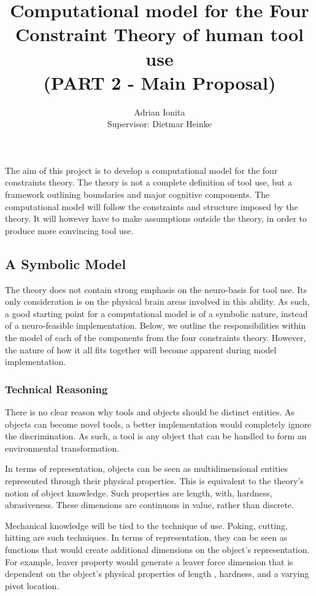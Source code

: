 \documentclass[11]{article}
\title{
  Computational model for the Four Constraint Theory of human tool use\\  
  \setlength{\parskip}{0.5em}  
  \normalsize (PART 2 - Main Proposal)
  }
\date{}
\author{Adrian Ionita\\
Supervisor: Dietmar Heinke}
\begin{document}
\maketitle 	

The aim of this project is to develop a computational model for the four constraints theory.
The theory is not a complete definition of tool use, but a framework outlining boundaries and major cognitive components.   
The computational model will follow the constraints and structure imposed by the theory. 
It will however have to make assumptions outside the theory, in order to produce more convincing tool use. 

\subsection*{A Symbolic Model}

The theory does not contain strong emphasis on the neuro-basis for tool use. Its only consideration is on the physical brain areas involved in this ability. As such, a good starting point for a computational model is of a symbolic nature, instead of a neuro-feasible implementation. Below, we outline the responsibilities within the model of each of the components from the four constraints theory. However, the nature of how it all fits together will become apparent during model implementation.

\subsubsection*{Technical Reasoning}

There is no clear reason why tools and objects should be distinct entities. As objects can become novel tools, a better implementation would completely ignore the discrimination. As such, a tool is any object that can be handled to form an environmental transformation. 

In terms of representation, objects can be seen as multidimensional entities represented through their physical properties. This is equivalent to the theory's notion of object knowledge. Such properties are length, with, hardness, abrasiveness. These dimensions are continuous in value, rather than discrete. 

Mechanical knowledge will be tied to the technique of use. Poking, cutting, hitting are such techniques. In terms of representation, they can be seen as functions that would create additional dimensions on the object's representation. For example, leaver property would generate a leaver force dimension that is dependent on the object's physical properties of length , hardness, and a varying pivot location.  
\end{document}
